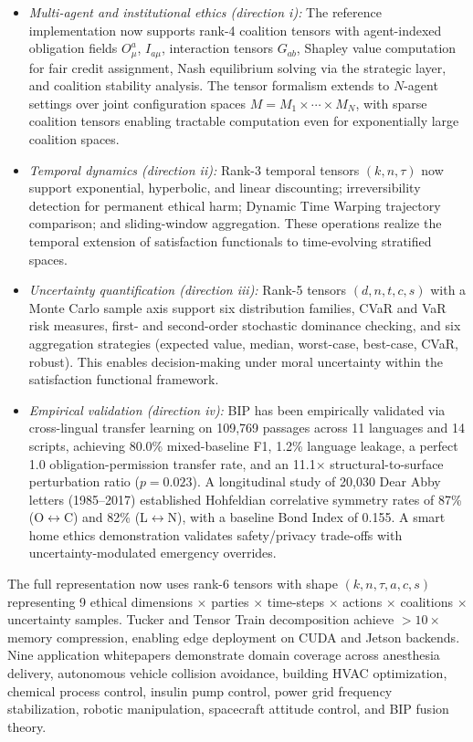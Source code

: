 \documentclass[12pt]{article}
\theoremstyle{plain}
\theoremstyle{definition}
\theoremstyle{remark}
\begin{document}
\begin{itemize}
\item \emph{Multi-agent and institutional ethics (direction i):} The reference implementation now supports rank-4 coalition tensors with agent-indexed obligation fields \(O_{\mu}^{a}\), \(I_{a\mu}\), interaction tensors \(G_{ab}\), Shapley value computation for fair credit assignment, Nash equilibrium solving via the strategic layer, and coalition stability analysis. The tensor formalism extends to \(N\)-agent settings over joint configuration spaces \(M = M_{1} \times \cdots \times M_{N}\), with sparse coalition tensors enabling tractable computation even for exponentially large coalition spaces.

\item \emph{Temporal dynamics (direction ii):} Rank-3 temporal tensors \((k, n, \tau)\) now support exponential, hyperbolic, and linear discounting; irreversibility detection for permanent ethical harm; Dynamic Time Warping trajectory comparison; and sliding-window aggregation. These operations realize the temporal extension of satisfaction functionals to time-evolving stratified spaces.

\item \emph{Uncertainty quantification (direction iii):} Rank-5 tensors \((d, n, t, c, s)\) with a Monte Carlo sample axis support six distribution families, CVaR and VaR risk measures, first- and second-order stochastic dominance checking, and six aggregation strategies (expected value, median, worst-case, best-case, CVaR, robust). This enables decision-making under moral uncertainty within the satisfaction functional framework.

\item \emph{Empirical validation (direction iv):} BIP has been empirically validated via cross-lingual transfer learning on 109,769 passages across 11 languages and 14 scripts, achieving 80.0\% mixed-baseline F1, 1.2\% language leakage, a perfect 1.0 obligation-permission transfer rate, and an 11.1$\times$ structural-to-surface perturbation ratio (\(p = 0.023\)). A longitudinal study of 20,030 Dear Abby letters (1985--2017) established Hohfeldian correlative symmetry rates of 87\% (O$\leftrightarrow$C) and 82\% (L$\leftrightarrow$N), with a baseline Bond Index of 0.155. A smart home ethics demonstration validates safety/privacy trade-offs with uncertainty-modulated emergency overrides.
\end{itemize}

The full representation now uses rank-6 tensors with shape \((k, n, \tau, a, c, s)\) representing 9 ethical dimensions \(\times\) parties \(\times\) time-steps \(\times\) actions \(\times\) coalitions \(\times\) uncertainty samples. Tucker and Tensor Train decomposition achieve \(>10\times\) memory compression, enabling edge deployment on CUDA and Jetson backends. Nine application whitepapers demonstrate domain coverage across anesthesia delivery, autonomous vehicle collision avoidance, building HVAC optimization, chemical process control, insulin pump control, power grid frequency stabilization, robotic manipulation, spacecraft attitude control, and BIP fusion theory.
\end{document}
